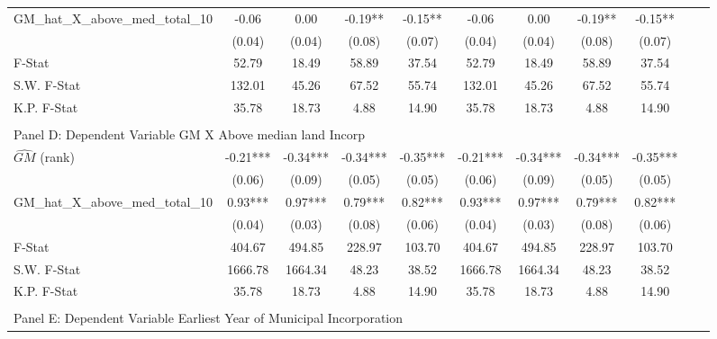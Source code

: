 \begin{table}[htbp]
\begin{threeparttable}
\begin{tabular}{l*{10}{c}}
\addlinespace
GM\_hat\_X\_above\_med\_total\_10&      -0.06   &       0.00   &      -0.19** &      -0.15** &      -0.06   &       0.00   &      -0.19** &      -0.15** \\
                &     (0.04)   &     (0.04)   &     (0.08)   &     (0.07)   &     (0.04)   &     (0.04)   &     (0.08)   &     (0.07)   \\
\midrule
F-Stat          &      52.79   &      18.49   &      58.89   &      37.54   &      52.79   &      18.49   &      58.89   &      37.54   \\
S.W. F-Stat     &     132.01   &      45.26   &      67.52   &      55.74   &     132.01   &      45.26   &      67.52   &      55.74   \\
K.P. F-Stat     &      35.78   &      18.73   &       4.88   &      14.90   &      35.78   &      18.73   &       4.88   &      14.90   \\
\cmidrule[\heavyrulewidth](lr){1-9} \\ \cmidrule[\heavyrulewidth](lr){1-9}
\multicolumn{8}{l}{Panel D: Dependent Variable GM X Above median land Incorp}\\
\cmidrule(lr){1-9}
$\hat{GM}$ (rank)&      -0.21***&      -0.34***&      -0.34***&      -0.35***&      -0.21***&      -0.34***&      -0.34***&      -0.35***\\
                &     (0.06)   &     (0.09)   &     (0.05)   &     (0.05)   &     (0.06)   &     (0.09)   &     (0.05)   &     (0.05)   \\
\addlinespace
GM\_hat\_X\_above\_med\_total\_10&       0.93***&       0.97***&       0.79***&       0.82***&       0.93***&       0.97***&       0.79***&       0.82***\\
                &     (0.04)   &     (0.03)   &     (0.08)   &     (0.06)   &     (0.04)   &     (0.03)   &     (0.08)   &     (0.06)   \\
\midrule
F-Stat          &     404.67   &     494.85   &     228.97   &     103.70   &     404.67   &     494.85   &     228.97   &     103.70   \\
S.W. F-Stat     &    1666.78   &    1664.34   &      48.23   &      38.52   &    1666.78   &    1664.34   &      48.23   &      38.52   \\
K.P. F-Stat     &      35.78   &      18.73   &       4.88   &      14.90   &      35.78   &      18.73   &       4.88   &      14.90   \\
\cmidrule[\heavyrulewidth](lr){1-9} \\ \cmidrule[\heavyrulewidth](lr){1-9}
\multicolumn{8}{l}{Panel E: Dependent Variable Earliest Year of Municipal Incorporation}\\

\end{tabular}
\end{threeparttable}
\end{table}
